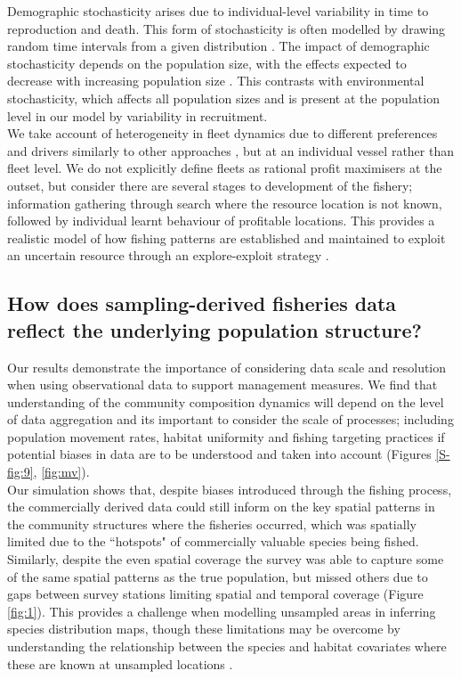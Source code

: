 \documentclass[review]{elsarticle}
\begin{document}
Demographic stochasticity arises due to individual-level variability in time to
reproduction and death. This form of stochasticity is often modelled by drawing
random time intervals from a given distribution \citep{Gillespie1977}. The
impact of demographic stochasticity depends on the population size, with the
effects expected to decrease with increasing population size \citep{Lande2010}.
This contrasts with environmental stochasticity, which affects all population
sizes and is present at the population level in our model by variability in
recruitment. \\

We take account of heterogeneity in fleet dynamics due to different preferences
and drivers similarly to other approaches \citep{Fulton2011}, but at an
individual vessel rather than fleet level. We do not explicitly define fleets
as rational profit maximisers at the outset, but consider there are several
stages to development of the fishery; information gathering through search
where the resource location is not known, followed by individual learnt
behaviour of profitable locations.  This provides a realistic model of how
fishing patterns are established and maintained to exploit an uncertain
resource through an explore-exploit strategy \citep{Mangel1983, Bailey2018}. 

\subsection{How does sampling-derived fisheries data reflect the underlying
	population structure?}


Our results demonstrate the importance of considering data scale and resolution
when using observational data to support management measures. We find that
understanding of the community composition dynamics will depend on the level of
data aggregation and its important to consider the scale of processes;
including population movement rates, habitat uniformity and fishing targeting
practices if potential biases in data are to be understood and taken into
account (Figures \ref{S-fig:9}, \ref{fig:mv}). \\

Our simulation shows that, despite biases introduced through the fishing
process, the commercially derived data could still inform on the key spatial
patterns in the community structures where the fisheries occurred, which was
spatially limited due to the ``hotspots" of commercially valuable species being
fished. Similarly, despite the even spatial coverage the survey was able to
capture some of the same spatial patterns as the true population, but missed
others due to gaps between survey stations limiting spatial and temporal
coverage (Figure \ref{fig:1}). This provides a challenge when
modelling unsampled areas in inferring species distribution maps, though these
limitations may be overcome by understanding the relationship between the
species and habitat covariates where these are known at unsampled locations
\citep{Robinson2011}. \\ 
\end{document}
